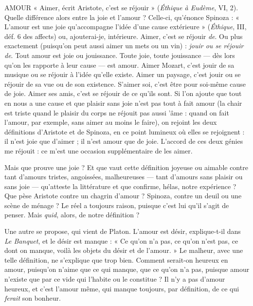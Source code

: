 AMOUR « Aimer, écrit Aristote, c’est se réjouir » ({\it Éthique à Eudème}, VI, 2).
Quelle différence alors entre la joie et l’amour ? Celle-ci, qu'énonce
Spinoza : « L'amour est une joie qu’accompagne l’idée d’une cause extérieure »
({\it Éthique}, III, déf. 6 des affects) ou, ajouterai-je, intérieure. Aimer, c’est se
réjouir {\it de}. Ou plus exactement (puisqu'on peut aussi aimer un mets ou un
vin) : {\it jouir ou se réjouir de}. Tout amour est joie ou jouissance. Toute joie, toute
jouissance — dès lors qu’on les rapporte à leur cause — est amour. Aimer Mozart,
c’est jouir de sa musique ou se réjouir à l’idée qu’elle existe. Aimer un paysage,
c’est jouir ou se réjouir de sa vue ou de son existence. S’aimer soi, c'est être
pour soi-même cause de joie. Aimer ses amis, c’est se réjouir de ce qu'ils sont.
Si l’on ajoute que tout en nous a une cause et que plaisir sans joie n'est pas tout
à fait amour (la chair est triste quand le plaisir du corps ne réjouit pas aussi
’âme : quand on fait l'amour, par exemple, sans aimer au moins le faire), on
rejoint les deux définitions d’Aristote et de Spinoza, en ce point lumineux où
elles se rejoignent : il n’est joie que d’aimer ; il n’est amour que de joie.
L'accord de ces deux génies me réjouit : ce m'est une occasion supplémentaire
de les aimer.

Mais que prouve une joie ? Et que vaut cette définition joyeuse ou aimable
contre tant d’amours tristes, angoissées, malheureuses — tant d’amours sans
plaisir ou sans joie — qu’atteste la littérature et que confirme, hélas, notre
expérience ? Que pèse Aristote contre un chagrin d'amour ? Spinoza, contre un
deuil ou une scène de ménage ? Le réel a toujours raison, puisque c’est lui qu’il
s’agit de penser. Mais {\it quid}, alors, de notre définition ?

Une autre se propose, qui vient de Platon. L'amour est désir, explique-t-il
dans {\it Le Banquet}, et le désir est manque : « Ce qu’on n’a pas, ce qu’on n’est pas,
ce dont on manque, voilà les objets du désir et de l’amour. » Le malheur, avec
une telle définition, ne s'explique que trop bien. Comment serait-on heureux
en amour, puisqu'on n’aime que ce qui manque, que ce qu’on n’a pas, puisque
amour n'existe que par ce vide qui l’habite ou le constitue ? Il n’y a pas
d'amour heureux, et c’est l'amour même, qui manque toujours, par définition,
de ce qui {\it ferait} son bonheur.


